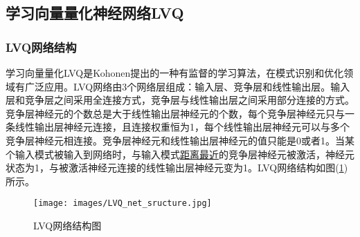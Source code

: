     \subsection{学习向量量化神经网络LVQ}
        \subsubsection{LVQ网络结构}
            \par
            学习向量量化LVQ是Kohonen提出的一种有监督的学习算法，在模式识别和优化领域有广泛应用。LVQ网络由3个网络层组成：输入层、竞争层和线性输出层。输入层和竞争层之间采用全连接方式，竞争层与线性输出层之间采用部分连接的方式。竞争层神经元的个数总是大于线性输出层神经元的个数，每个竞争层神经元只与一条线性输出层神经元连接，且连接权重恒为1，每个线性输出层神经元可以与多个竞争层神经元相连接。竞争层神经元和线性输出层神经元的值只能是0或者1。当某个输入模式被输入到网络时，与输入模式\underline{距离最近}的竞争层神经元被激活，神经元状态为1，与被激活神经元连接的线性输出层神经元变为1。LVQ网络结构如图(\ref{fig:LVQ网络结构图})所示。
            \begin{figure}[H]
            \centering
            \texttt{[image: images/LVQ\_net\_sructure.jpg]}
            \caption{LVQ网络结构图}
            \label{fig:LVQ网络结构图}
            \end{figure}
